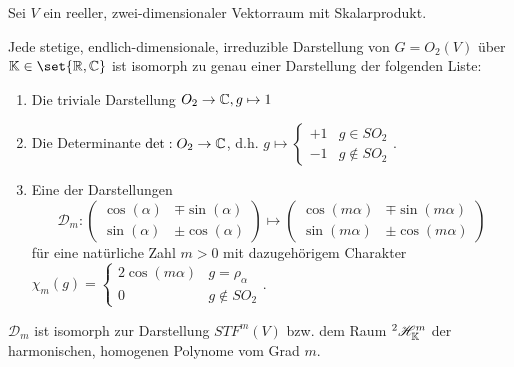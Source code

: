 \begin{theorem}
Sei $V$ ein reeller, zwei-dimensionaler Vektorraum mit Skalarprodukt.

Jede stetige, endlich-dimensionale, irreduzible Darstellung von $G=O_2(V)$ über $\IK\in\set{\IR,\IC}$ ist isomorph zu genau einer Darstellung der folgenden Liste:
\begin{enumerate}
\item Die triviale Darstellung $O_2\to\mathbb{C}, g\mapsto 1$
\item Die Determinante $\det: O_2\to\mathbb{C}$, d.h. $g\mapsto\begin{cases}+1&g\in SO_2 \\ -1&g\notin SO_2\end{cases}$.
\item Eine der Darstellungen
\[\mathcal{D}_m : \begin{pmatrix}\cos(\alpha)&\mp\sin(\alpha)\\\sin(\alpha)&\pm\cos(\alpha)\end{pmatrix} \mapsto \begin{pmatrix}\cos(m\alpha)&\mp\sin(m\alpha)\\\sin(m\alpha)&\pm\cos(m\alpha)\end{pmatrix}\]
für eine natürliche Zahl $m>0$ mit dazugehörigem Charakter $\chi_m(g) = \begin{cases} 2\cos(m\alpha) & g=\rho_\alpha \\ 0 & g\notin SO_2\end{cases}$.
\end{enumerate}
$\mathcal{D}_m$ ist isomorph zur Darstellung $STF^m(V)$ bzw. dem Raum ${^2} \mathscr{H}_{\mathbb{K}}^m$ der harmonischen, homogenen Polynome vom Grad $m$.
\end{theorem}
